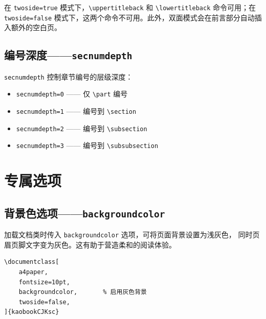 \begin{kaobox}[title=注意事项]
在 \texttt{twoside=true} 模式下，\texttt{\textbackslash uppertitleback} %
和 \texttt{\textbackslash lowertitleback} 命令可用；在 \texttt{twoside=false}
模式下，这两个命令不可用。此外，双面模式会在前言部分自动插入额外的空白页。
\end{kaobox}

\subsection{编号深度——\texttt{secnumdepth}}


\texttt{secnumdepth} 控制章节编号的层级深度：

\begin{itemize}
    \item \texttt{secnumdepth=0} —— 仅 \texttt{\textbackslash part} 编号
    \item \texttt{secnumdepth=1} —— 编号到 \texttt{\textbackslash section}
    \item \texttt{secnumdepth=2} —— 编号到 \texttt{\textbackslash subsection}
    \item \texttt{secnumdepth=3} —— 编号到 \texttt{\textbackslash subsubsection}
\end{itemize}


\section{专属选项}


\subsection{背景色选项——\texttt{backgroundcolor}}

加载文档类时传入 \texttt{backgroundcolor} 选项，可将页面背景设置为浅灰色，
同时页眉页脚文字变为灰色。这有助于营造柔和的阅读体验。

\begin{lstlisting}
\documentclass[
    a4paper,
    fontsize=10pt,
    backgroundcolor,       % 启用灰色背景
    twoside=false,
]{kaobookCJKsc}
\end{lstlisting}

